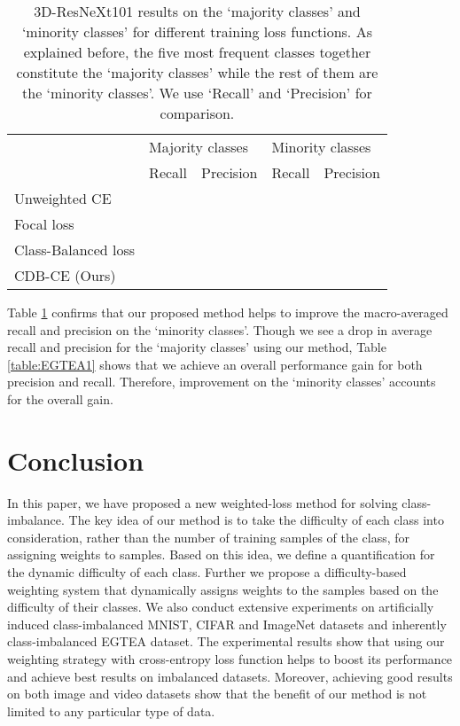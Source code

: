 \documentclass[runningheads]{llncs}
\begin{document}
\setlength{\tabcolsep}{4pt}
\begin{table}[t]
\begin{center}
\caption{
3D-ResNeXt101 results on the ‘majority classes’ and ‘minority classes’ for different
training loss functions. As explained before, the five most frequent classes together constitute
the ‘majority classes’ while the rest of them are the ‘minority classes’. We use ‘Recall’ and ‘Precision’ for comparison.
}
\label{table:EGTEA2}
\begin{tabular}{lllll}
\hline\noalign{\smallskip}
 & \multicolumn{2}{l}{Majority classes} &  \multicolumn{2}{l}{Minority classes} \\
\noalign{\smallskip}
\hline
\noalign{\smallskip}
 & Recall & Precision & Recall & Precision \\
\noalign{\smallskip}
\noalign{\smallskip}
Unweighted CE & &  &  & \\
Focal loss \cite{FOCALloss} & &  &  & \\
Class-Balanced loss \cite{Class_balancedloss}& &  &  & \\
CDB-CE (Ours)& &  &  & \\
\hline
\end{tabular}
\end{center}
\end{table}
\setlength{\tabcolsep}{1.4pt}


Table \ref{table:EGTEA2} confirms that our proposed method helps to improve the macro-averaged
recall and precision on the ‘minority classes’. Though we see a drop in average 
recall and precision for the ‘majority classes’ using our method, Table \ref{table:EGTEA1} shows 
that we achieve an overall performance gain for both precision and recall. 
Therefore, improvement on the ‘minority classes’ accounts for the overall gain.




\section{Conclusion}
In this paper, we have proposed a new weighted-loss method for solving 
class-imbalance. The key idea of our method is to take the difficulty of each 
class into consideration, rather than the number of training samples of the 
class, for assigning weights to samples. Based on this idea, we define a 
quantification for the dynamic difficulty of each class. Further we propose a 
difficulty-based weighting system that dynamically assigns weights to the 
samples based on the difficulty of their classes. We also conduct extensive 
experiments on artificially induced class-imbalanced MNIST, CIFAR and ImageNet datasets 
and inherently class-imbalanced EGTEA dataset. The experimental results show 
that using our weighting strategy with cross-entropy loss function helps to 
boost its performance and achieve best results on imbalanced
datasets. Moreover, achieving good results on both image and video datasets show
that the benefit of our method is not limited to any particular type of data.










\end{document}
